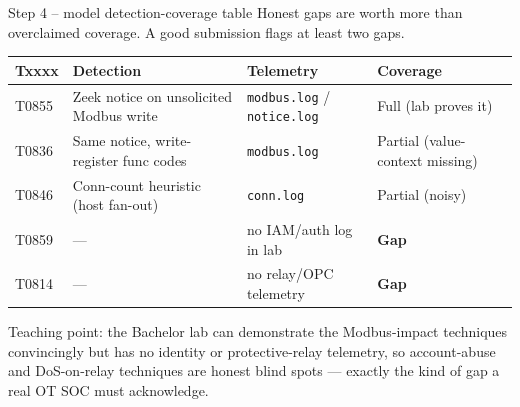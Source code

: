 \documentclass[11pt,a4paper]{article}
\begin{document}
\begin{solutionbox}{Step 4 -- model detection-coverage table}
Honest gaps are worth more than overclaimed coverage. A good submission flags at
least two gaps.

\begin{center}\footnotesize
\begin{tabular}{@{}p{1.6cm}p{4.4cm}p{3.6cm}p{4.0cm}@{}}
\toprule
\textbf{Txxxx} & \textbf{Detection} & \textbf{Telemetry} & \textbf{Coverage} \\
\midrule
T0855 & Zeek notice on unsolicited Modbus write & \texttt{modbus.log} / \texttt{notice.log} & Full (lab proves it) \\
T0836 & Same notice, write-register func codes  & \texttt{modbus.log} & Partial (value-context missing) \\
T0846 & Conn-count heuristic (host fan-out)     & \texttt{conn.log} & Partial (noisy) \\
T0859 & ---                                     & no IAM/auth log in lab & \textbf{Gap} \\
T0814 & ---                                     & no relay/OPC telemetry & \textbf{Gap} \\
\bottomrule
\end{tabular}
\end{center}

Teaching point: the Bachelor lab can demonstrate the Modbus-impact techniques
convincingly but has no identity or protective-relay telemetry, so
account-abuse and DoS-on-relay techniques are honest blind spots --- exactly the
kind of gap a real OT SOC must acknowledge.
\end{solutionbox}
\end{document}
